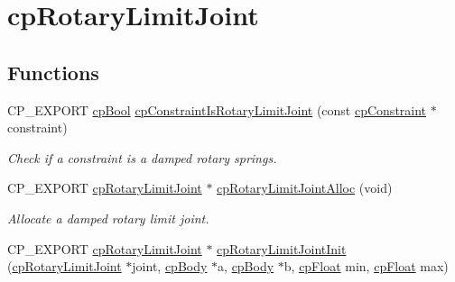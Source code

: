 \hypertarget{group__cp_rotary_limit_joint}{}\section{cp\+Rotary\+Limit\+Joint}
\label{group__cp_rotary_limit_joint}
\subsection*{Functions}
\begin{DoxyCompactItemize}
\item 
\mbox{\label{group__cp_rotary_limit_joint_ga676880ce66a491fe7576e4574825a403}} 
C\+P\+\_\+\+E\+X\+P\+O\+RT \mbox{\hyperlink{group__basic_types_gabc5e752c48f3449ca26ef413ecbd647e}{cp\+Bool}} \mbox{\hyperlink{group__cp_rotary_limit_joint_ga676880ce66a491fe7576e4574825a403}{cp\+Constraint\+Is\+Rotary\+Limit\+Joint}} (const \mbox{\hyperlink{structcp_constraint}{cp\+Constraint}} $\ast$constraint)
\begin{DoxyCompactList}\small\item\em Check if a constraint is a damped rotary springs. \end{DoxyCompactList}\item 
\mbox{\label{group__cp_rotary_limit_joint_ga14ee390427b69d5f29bbd2dc80cd41b6}} 
C\+P\+\_\+\+E\+X\+P\+O\+RT \mbox{\hyperlink{structcp_rotary_limit_joint}{cp\+Rotary\+Limit\+Joint}} $\ast$ \mbox{\hyperlink{group__cp_rotary_limit_joint_ga14ee390427b69d5f29bbd2dc80cd41b6}{cp\+Rotary\+Limit\+Joint\+Alloc}} (void)
\begin{DoxyCompactList}\small\item\em Allocate a damped rotary limit joint. \end{DoxyCompactList}\item 
\mbox{\label{group__cp_rotary_limit_joint_gabe655435adf8b1441e6ddbb93c2e5dc8}} 
C\+P\+\_\+\+E\+X\+P\+O\+RT \mbox{\hyperlink{structcp_rotary_limit_joint}{cp\+Rotary\+Limit\+Joint}} $\ast$ \mbox{\hyperlink{group__cp_rotary_limit_joint_gabe655435adf8b1441e6ddbb93c2e5dc8}{cp\+Rotary\+Limit\+Joint\+Init}} (\mbox{\hyperlink{structcp_rotary_limit_joint}{cp\+Rotary\+Limit\+Joint}} $\ast$joint, \mbox{\hyperlink{structcp_body}{cp\+Body}} $\ast$a, \mbox{\hyperlink{structcp_body}{cp\+Body}} $\ast$b, \mbox{\hyperlink{group__basic_types_gac1ed65573e035bf892505768c852d8d3}{cp\+Float}} min, \mbox{\hyperlink{group__basic_types_gac1ed65573e035bf892505768c852d8d3}{cp\+Float}} max)

\end{DoxyCompactItemize}
